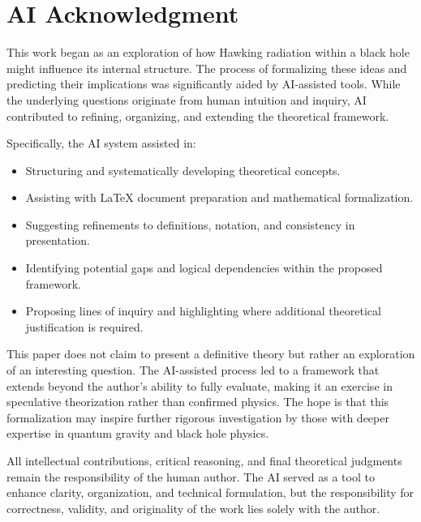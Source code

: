 \section*{AI Acknowledgment}

This work began as an exploration of how Hawking radiation within a black hole might influence its internal structure. The process of formalizing these ideas and predicting their implications was significantly aided by AI-assisted tools. While the underlying questions originate from human intuition and inquiry, AI contributed to refining, organizing, and extending the theoretical framework.

Specifically, the AI system assisted in:
\begin{itemize}
    \item Structuring and systematically developing theoretical concepts.
    \item Assisting with LaTeX document preparation and mathematical formalization.
    \item Suggesting refinements to definitions, notation, and consistency in presentation.
    \item Identifying potential gaps and logical dependencies within the proposed framework.
    \item Proposing lines of inquiry and highlighting where additional theoretical justification is required.
\end{itemize}

This paper does not claim to present a definitive theory but rather an exploration of an interesting question. The AI-assisted process led to a framework that extends beyond the author's ability to fully evaluate, making it an exercise in speculative theorization rather than confirmed physics. The hope is that this formalization may inspire further rigorous investigation by those with deeper expertise in quantum gravity and black hole physics.

All intellectual contributions, critical reasoning, and final theoretical judgments remain the responsibility of the human author. The AI served as a tool to enhance clarity, organization, and technical formulation, but the responsibility for correctness, validity, and originality of the work lies solely with the author.
